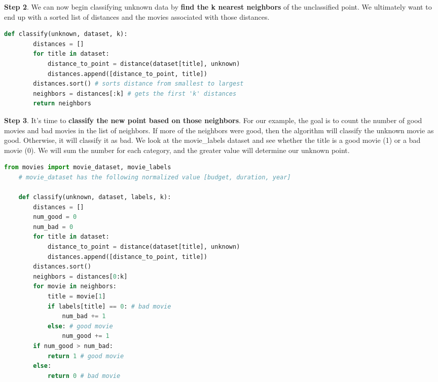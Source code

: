 \documentclass[11pt, a4paper]{article}
\begin{document}
\begin{spacing}{1.1}
	\noindent \textbf{Step 2}. We can now begin classifying unknown data by \textbf{find the k nearest neighbors} of the unclassified point. We ultimately want to end up with a sorted list of distances and the movies associated with those distances.
	\begin{lstlisting}[language=Python]
	def classify(unknown, dataset, k):
		distances = []
		for title in dataset:
			distance_to_point = distance(dataset[title], unknown)
			distances.append([distance_to_point, title])
		distances.sort() # sorts distance from smallest to largest
		neighbors = distances[:k] # gets the first 'k' distances
		return neighbors \end{lstlisting}\vspace*{1mm}
	\textbf{Step 3}. It's time to \textbf{classify the new point based on those neighbors}. For our example, the goal is to count the number of good movies and bad movies in the list of neighbors. If more of the neighbors were good, then the algorithm will classify the unknown movie as good. Otherwise, it will classify it as bad. We look at the movie\_labels dataset and see whether the title is a good movie (1) or a bad movie (0). We will sum the number for each category, and the greater value will determine our unknown point. 
	\begin{lstlisting}[language=Python]
	from movies import movie_dataset, movie_labels
	# movie_dataset has the following normalized value [budget, duration, year]
	
	def classify(unknown, dataset, labels, k):
		distances = []
		num_good = 0
		num_bad = 0
		for title in dataset:
			distance_to_point = distance(dataset[title], unknown)
			distances.append([distance_to_point, title])
		distances.sort()
		neighbors = distances[0:k]
		for movie in neighbors:
			title = movie[1]
			if labels[title] == 0: # bad movie
				num_bad += 1
			else: # good movie
				num_good += 1
		if num_good > num_bad:
			return 1 # good movie
		else:
			return 0 # bad movie
	

\end{lstlisting}
\end{spacing}
\end{document}
